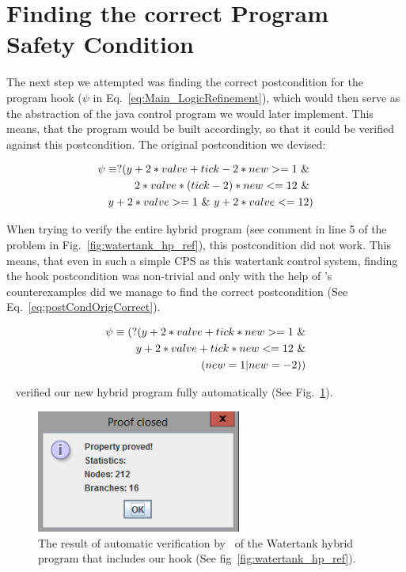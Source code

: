 \section{Finding the correct Program Safety Condition}
\label{sec:Watertank:SafetyCond}

The next step we attempted was finding the correct postcondition for the program hook (\(\psi\) in Eq.~\ref{eq:Main_LogicRefinement}), which would then serve as the abstraction of the java control program we would later implement. This means, that the program would be built accordingly, so that it could be verified against this postcondition. The original postcondition we devised:

\begin{equation}
	\centering
	\begin{split}
		\psi \equiv ?( y + 2* valve + tick -2 * new  >= 1~\&~ \\ 2 * valve * (tick - 2) * new <= 12~\&~ \\  y + 2* valve >= 1~\&~ y + 2 * valve <= 12) 
	\end{split}
\label{eq:postCondOrig}
\end{equation}

When trying to verify the entire hybrid program (see comment in line 5 of the problem in Fig.~\ref{fig:watertank_hp_ref}), this postcondition did not work. This means, that even in such a simple CPS as this watertank control system, finding the hook postcondition was non-trivial and only with the help of \keym's counterexamples did we manage to find the correct postcondition (See Eq.~\ref{eq:postCondOrigCorrect}). 

\begin{equation}
	\centering
	\begin{split}
		\psi \equiv (?(y + 2 * valve + tick * new >= 1~\& \\ y + 2 * valve + tick * new <= 12~\& \\(new = 1 | new = -2))
	\end{split}
	\label{eq:postCondOrigCorrect}
\end{equation}

\keym~ verified our new hybrid program fully automatically (See Fig.~\ref{fig:KeymaeraVerWatertank}).

\begin{figure}
	\centering
	\includegraphics[width=0.6\textwidth]{images/watertank_keym_ver}
	\caption{The result of automatic verification by \keym~of the Watertank hybrid program that includes our hook (See fig~\ref{fig:watertank_hp_ref}).}
	\label{fig:KeymaeraVerWatertank}
\end{figure}


